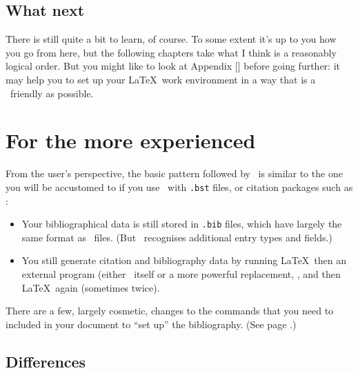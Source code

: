 \subsection{What next}

There is still quite a bit to learn, of course. To some extent it's up to you how you go from here, but the following chapters take what I think is a reasonably logical order. But you might like to look at Appendix [] before going further: it may help you to set up your \LaTeX\ work environment in a way that is a \biblatex\ friendly as possible.

\section{For the more experienced}

From the user's perspective, the basic pattern followed by \biblatex\ is similar to the one you will be accustomed to if you use \bibtex\ with \verb|.bst| files, or citation packages such as :
\begin{itemize}
\item Your bibliographical data is still stored in \verb|.bib| files, which have largely the same format as \bibtex\ files. (But \biblatex\ recognises additional entry types and fields.)
\item You still generate citation and bibliography data by running \LaTeX\, then an external program (either \bibtex\ itself or a more powerful replacement, , and then \LaTeX\ again (sometimes twice).
\end{itemize}

There are a few, largely cosmetic, changes to the commands that you need to included in your document to ``set up'' the bibliography. (See page \pageref{bibtex:simple:eg}.)

\subsection{Differences}

